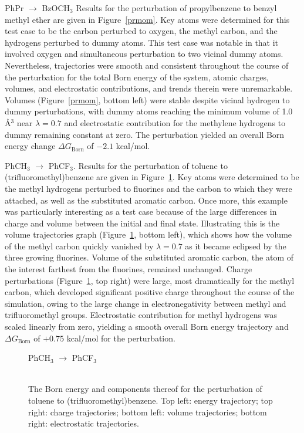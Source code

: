 \documentclass[12pt]{report}
\def\figlab{Figure}\def\figslab{\figlab s}
\newcommand*\fig[1]{\figlab~\ref{#1}}
\begin{document}
PhPr $\longrightarrow$ BzOCH$_3$ Results for the perturbation of propylbenzene to benzyl methyl ether are given in \fig{prmom}. Key atoms were determined for this test case to be the carbon perturbed to oxygen, the methyl carbon, and the hydrogens perturbed to dummy atoms. This test case was notable in that it involved oxygen and simultaneous perturbation to two vicinal dummy atoms. Nevertheless, trajectories were smooth and consistent throughout the course of the perturbation for the total Born energy of the system, atomic charges, volumes, and electrostatic contributions, and trends therein were unremarkable. Volumes (\fig{prmom}, bottom left) were stable despite vicinal hydrogen to dummy perturbations, with dummy atoms reaching the minimum volume of 1.0 \AA$^3$ near $\lambda = 0.7$ and electrostatic contribution for the methylene hydrogens to dummy remaining constant at zero. The perturbation yielded an overall Born energy change $\Delta G_{ \textrm{Born}}$ of $-2.1$ kcal/mol.

PhCH$_3$ $\longrightarrow$ PhCF$_3$. Results for the perturbation of toluene to (trifluoromethyl)benzene are given in \fig{ch3cf3}. Key atoms were determined to be the methyl hydrogens perturbed to fluorines and the carbon to which they were attached, as well as the substituted aromatic carbon. Once more, this example was particularly interesting as a test case because of the large differences in charge and volume between the initial and final state. Illustrating this is the volume trajectories graph (\fig{ch3cf3}, bottom left), which shows how the volume of the methyl carbon quickly vanished by $\lambda = 0.7$ as it became eclipsed by the three growing fluorines. Volume of the substituted aromatic carbon, the atom of the interest farthest from the fluorines, remained unchanged. Charge perturbations (\fig{ch3cf3}, top right) were large, most dramatically for the methyl carbon, which developed significant positive charge throughout the course of the simulation, owing to the large change in electronegativity between methyl and trifluoromethyl groups. Electrostatic contribution for methyl hydrogens was scaled linearly from zero, yielding a smooth overall Born energy trajectory and $\Delta G_{ \textrm{Born}}$ of $+0.75$ kcal/mol for the perturbation.


\begin{figure}[t!]
\centering
PhCH$_3$ $\longrightarrow$ PhCF$_3$\\
\hspace*{-1.3cm}\\
\hspace*{-1.3cm}
\caption{The Born energy and components thereof for the perturbation of toluene to (trifluoromethyl)benzene. Top left: energy trajectory; top right: charge trajectories; bottom left: volume trajectories; bottom right: electrostatic trajectories.}
\label{ch3cf3}
\end{figure}
\end{document}
